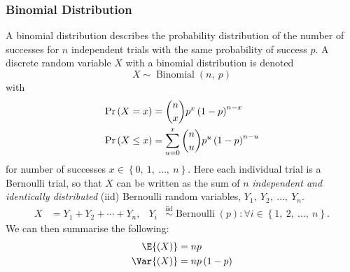 \documentclass{article}
\begin{document}
\subsubsection{Binomial Distribution}
A binomial distribution describes the probability distribution of the
number of successes for \(n\) independent trials with the same
probability of success \(p\). A discrete random variable \(X\) with a
binomial distribution is denoted
\begin{equation*}
    X \sim \operatorname{Binomial}{\left( n,\: p \right)}
\end{equation*}
with
\begin{align*}
    \Pr{\left( X = x \right)}    & = \dbinom{n}{x} p^x \left( 1 - p \right)^{n - x}                \\
    \Pr{\left( X \leq x \right)} & = \sum_{u = 0}^x \dbinom{n}{u} p^u \left( 1 - p \right)^{n - u}
\end{align*}
for number of successes \(x \in \left\{ 0,\: 1,\: \dots,\: n \right\}\).
Here each individual trial is a Bernoulli trial, so that \(X\) can be
written as the sum of \(n\) \textit{independent and identically
    distributed} (iid) Bernoulli random variables, \(Y_1,\: Y_2,\: \dots,\:
Y_n\).
\begin{align*}
    X & = Y_1 + Y_2 + \cdots + Y_n, & Y_i & \overset{\mathrm{iid}}{\sim} \operatorname{Bernoulli}{\left( p \right)} : \forall i \in \left\{ 1,\: 2,\: \dots,\: n \right\}.
\end{align*}
We can then summarise the following:
\begin{align*}
    \E{\left( X \right)}   & = np                      \\
    \Var{\left( X \right)} & = np \left( 1 - p \right)
\end{align*}
\end{document}
